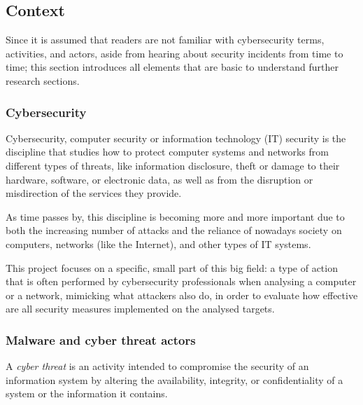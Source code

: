 
\pagebreak
\subsection{Context}
\label{sec:context}

Since it is assumed that readers are not familiar with cybersecurity terms, activities, and actors, aside from hearing about security incidents from time to time; this section introduces all elements that are basic to understand further research sections.

\subsubsection{Cybersecurity}
\label{sssec:cybersec}

Cybersecurity, computer security or information technology (IT) security is the discipline that studies how to protect computer systems and networks from different types of threats, like information disclosure, theft or damage to their hardware, software, or electronic data, as well as from the disruption or misdirection of the services they provide. 

As time passes by, this discipline is becoming more and more important due to both the increasing number of attacks and the reliance of nowadays society on computers, networks (like the Internet), and other types of IT systems. 

This project focuses on a specific, small part of this big field: a type of action that is often performed by cybersecurity professionals when analysing a computer or a network, mimicking what attackers also do, in order to evaluate how effective are all security measures implemented on the analysed targets.

\subsubsection{Malware and cyber threat actors}
\label{sssec:apt}

A \textit{cyber threat} is an activity intended to compromise the security of an information system by altering the availability, integrity, or confidentiality of a system or the information it contains\cite{CanadaWeb}. 

